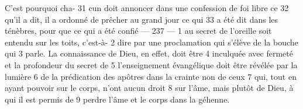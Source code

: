 C'est pourquoi cha-	 
31	 	cun doit annoncer dans une confession de foi libre ce	 
32	 	qu'il a dit, il a ordonné de prêcher au grand jour ce qui	 
33	 	a été dit dans les ténèbres, pour que ce qui a été confié	 
 	--- 237 ---	 
1	 	au secret de l'oreille soit entendu sur les toits, c'est-à-	 
2	 	dire par une proclamation qui s'élève de la bouche qui	 
3	 	parle. La connaissance de Dieu, en effet, doit être	 
4	 	inculquée avec fermeté et la profondeur du secret de	 
5	 	l'enseignement évangélique doit être révélée par la lumière	 
6	 	de la prédication des apôtres dans la crainte non de ceux	 
7	 	qui, tout en ayant pouvoir sur le corps, n'ont aucun droit	 
8	 	sur l'âme, mais plutôt de Dieu, à qui il est permis de	 
9	 	perdre l'âme et le corps dans la géhenne.